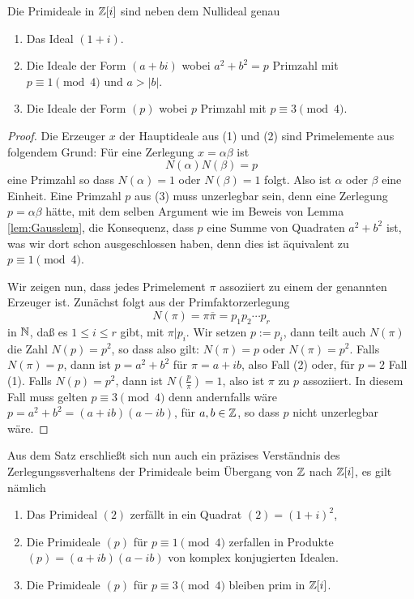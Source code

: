 \documentclass{book}
\begin{document}
\begin{thm}
    \label{thm:gaussprimes}
    Die Primideale in $\mathbb{Z}[i]$ sind neben dem Nullideal genau 
    \begin{enumerate}
        \item Das Ideal $(1+i)$.
        \item Die Ideale der Form $(a + bi)$ wobei $a^2 + b^2 = p$ Primzahl mit $p \equiv 1 \pmod{4}$ und $a > |b|$. 
        \item Die Ideale der Form $(p)$ wobei $p$ Primzahl mit $p \equiv 3 \pmod{4}$.
    \end{enumerate}
\end{thm}
\begin{proof}
    Die Erzeuger $x$ der Hauptideale aus (1) und (2) sind Primelemente aus
    folgendem Grund: Für eine Zerlegung $x = \alpha \beta$ ist 
    \[
        N(\alpha) N(\beta) = p
    \]
    eine Primzahl so dass $N(\alpha) = 1$ oder $N(\beta) = 1$ folgt. Also ist
    $\alpha$ oder $\beta$ eine Einheit. Eine Primzahl $p$ aus (3) muss
    unzerlegbar sein, denn eine Zerlegung $p = \alpha \beta$ hätte, mit dem
    selben Argument wie im Beweis von Lemma \ref{lem:Gausslem}, die Konsequenz,
    dass $p$ eine Summe von Quadraten $a^2 + b^2$ ist, was wir dort schon
    ausgeschlossen haben, denn dies ist äquivalent zu $p \equiv 1 \pmod{4}$.

    Wir zeigen nun, dass jedes Primelement $\pi$ assoziiert zu einem der
    genannten Erzeuger ist. Zunächst folgt aus der Primfaktorzerlegung
    \[
        N(\pi) = \pi \overline{\pi} = p_1 p_2 \cdots p_r
    \]
    in $\mathbb{N}$, daß es $1 \le i \le r$ gibt, mit $\pi|p_i$. Wir setzen $p := p_i$,
    dann teilt auch $N(\pi)$ die Zahl $N(p) = p^2$, so dass also gilt: $N(\pi)
    = p$ oder $N(\pi) = p^2$. Falls $N(\pi) = p$, dann ist $p = a^2 + b^2$ für
    $\pi = a + ib$, also Fall (2) oder, für $p=2$ Fall (1). Falls $N(p) = p^2$,
    dann ist $N(\frac{p}{\pi}) = 1$, also ist $\pi$ zu $p$ assoziiert. In
    diesem Fall muss gelten $p \equiv 3 \pmod{4}$ denn andernfalls wäre $p =
    a^2 + b^2 = (a +i b)(a-ib)$, für $a,b \in \mathbb{Z}$, so dass $p$ nicht
    unzerlegbar wäre. 
\end{proof}

\begin{exa}
    \label{exa:verzweigung}
    Aus dem Satz erschließt sich nun auch ein präzises Verständnis des
    Zerlegungssverhaltens der Primideale beim Übergang von $\mathbb{Z}$ nach
    $\mathbb{Z}[i]$, es gilt nämlich
    \begin{enumerate}
        \item Das Primideal $(2)$ zerfällt in ein Quadrat $(2) = (1+i)^2$, 
        \item Die Primideale $(p)$ für $p \equiv 1 \pmod{4}$ zerfallen in
            Produkte $(p) = (a + i b)(a-ib)$ von komplex konjugierten Idealen. 
        \item Die Primideale $(p)$ für $p \equiv 3 \pmod{4}$ bleiben prim in $\mathbb{Z}[i]$.
    \end{enumerate}
\end{exa}
\end{document}

